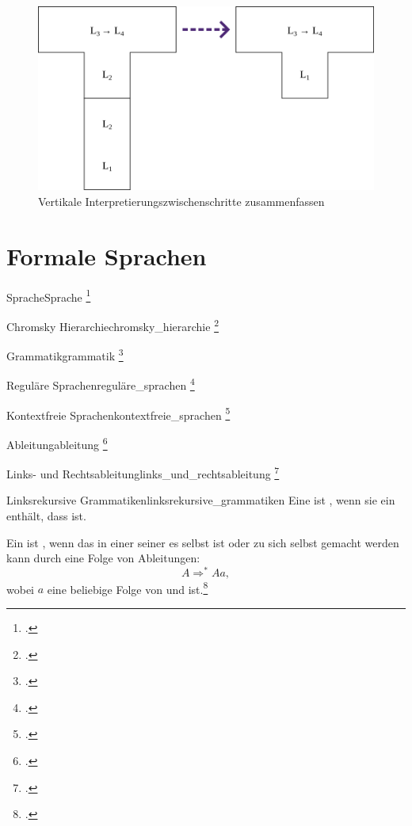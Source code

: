 \begin{figure}[H]
  \centering
  \includegraphics[width=0.5\linewidth]{./figures/summarize_interpreter.png}
  \caption{Vertikale Interpretierungszwischenschritte zusammenfassen}
  \label{fig:t_diagram_vertikal_zusammenfassen}
\end{figure}

\section{Formale Sprachen}
\begin{Definition}{Sprache}{Sprache}
  \footcite{nebel_theoretische_2020}
\end{Definition}
\begin{Definition}{Chromsky Hierarchie}{chromsky_hierarchie}
  \footcite{nebel_theoretische_2020}
\end{Definition}
\begin{Definition}{Grammatik}{grammatik}
  \footcite{nebel_theoretische_2020}
\end{Definition}
\begin{Definition}{Reguläre Sprachen}{reguläre_sprachen}
  \footcite{nebel_theoretische_2020}
\end{Definition}
\begin{Definition}{Kontextfreie Sprachen}{kontextfreie_sprachen}
  \footcite{nebel_theoretische_2020}
\end{Definition}
\begin{Definition}{Ableitung}{ableitung}
  \footcite{nebel_theoretische_2020}
\end{Definition}
\begin{Definition}{Links- und Rechtsableitung}{links_und_rechtsableitung}
  \footcite{nebel_theoretische_2020}
\end{Definition}
\begin{Definition}{Linksrekursive Grammatiken}{linksrekursive_grammatiken}
Eine  ist , wenn sie ein   enthält, dass  ist.

Ein  ist  , wenn das  in einer seiner  es selbst ist oder zu sich selbst gemacht werden kann durch eine Folge von Ableitungen:
\begin{equation*}
  A \Rightarrow^{*} Aa,
\end{equation*}
wobei $a$ eine beliebige Folge von  und  ist.\footcite{noauthor_parsing_nodate}
\end{Definition}

